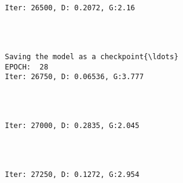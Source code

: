 \documentclass[11pt]{article}
\begin{document}
    \begin{center}
    \end{center}
    { \hspace*{\fill} \\}
    
    \begin{Verbatim}[commandchars=\\\{\}]

Iter: 26500, D: 0.2072, G:2.16
    \end{Verbatim}

    \begin{center}
    \end{center}
    { \hspace*{\fill} \\}
    
    \begin{Verbatim}[commandchars=\\\{\}]

Saving the model as a checkpoint{\ldots}
EPOCH:  28
Iter: 26750, D: 0.06536, G:3.777
    \end{Verbatim}

    \begin{center}
    \end{center}
    { \hspace*{\fill} \\}
    
    \begin{Verbatim}[commandchars=\\\{\}]

Iter: 27000, D: 0.2835, G:2.045
    \end{Verbatim}

    \begin{center}
    \end{center}
    { \hspace*{\fill} \\}
    
    \begin{Verbatim}[commandchars=\\\{\}]

Iter: 27250, D: 0.1272, G:2.954
    \end{Verbatim}
\end{document}
